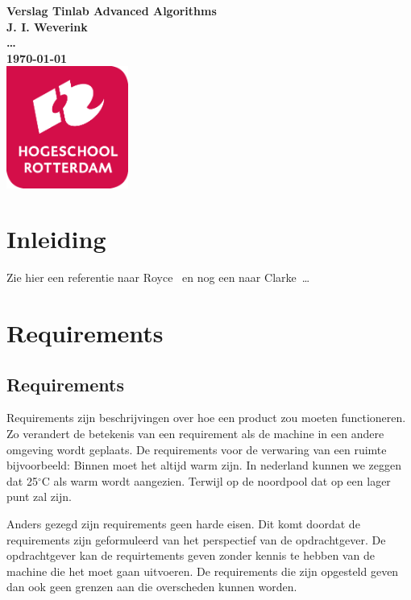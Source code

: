 \documentclass{article}%
\begin{document}
\sffamily
\begin{titlepage}
  \centering
    \vfill
    {\bfseries\Huge
      Verslag Tinlab Advanced Algorithms \\
        \vskip2cm
      }
      {\bfseries\Large
        J. I. Weverink\\
      }
      {
        \bfseries\normalsize
        \ldots\\
        \vskip1cm
        \today\\
    }    
    \vfill
    \includegraphics[width=4cm]{pictures/logohr.png} %
    \vfill
    \vfill
\end{titlepage}
\newpage
\tableofcontents

\newpage
\section{Inleiding}
Zie hier een referentie naar Royce~\cite{royce1987managing} en nog een naar Clarke~\cite{modelchecking}\ldots 

\clearpage

\section{Requirements}

\subsection{Requirements}
Requirements zijn beschrijvingen over hoe een product zou moeten functioneren. Zo verandert de betekenis van een requirement als de machine in een andere omgeving wordt geplaats. De requirements voor de verwaring van een ruimte bijvoorbeeld: Binnen moet het altijd warm zijn. In nederland kunnen we zeggen dat 25$^{\circ}$C als warm wordt aangezien. Terwijl op de noordpool dat op een lager punt zal zijn.

Anders gezegd zijn requirements geen harde eisen. Dit komt doordat de requirements zijn geformuleerd van het perspectief van de opdrachtgever. De opdrachtgever kan de requirtements geven zonder kennis te hebben van de machine die het moet gaan uitvoeren. De requirements die zijn opgesteld geven dan ook geen grenzen aan die overscheden kunnen worden.
\end{document}

